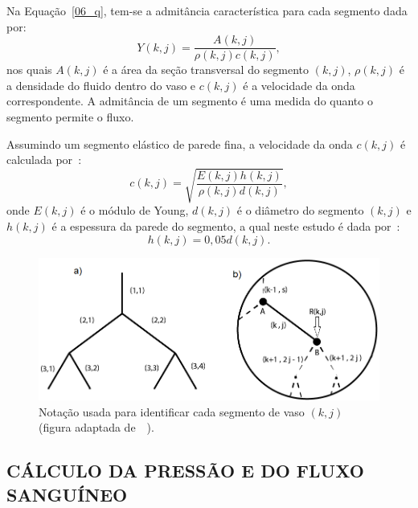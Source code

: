 Na Equação~\eqref{06_q}, tem-se a admitância característica para cada segmento dada por:
\begin{equation}
	Y(k,j) = \frac{A(k,j)}{\rho(k,j)c(k,j)},
	\label{eq:admitancia}
\end{equation}
nos quais $A(k,j)$ é a área da seção transversal do segmento $(k,j)$, $\rho(k,j)$ é a densidade do fluido dentro do vaso e $c(k,j)$ é a velocidade da onda correspondente. A admitância de um segmento é uma medida do quanto o segmento permite o fluxo.

Assumindo um segmento elástico de parede fina, a velocidade da onda $c(k,j)$ é calculada
por~\cite{Fung}:
\begin{equation}
	c(k,j) = \sqrt{\frac{E(k,j) h(k,j)}{\rho(k,j) d(k,j)}},\label{eq:velocidade}
\end{equation}
onde $E(k,j)$ é o módulo de Young, $d(k,j)$ é o diâmetro do segmento $(k,j)$ e $h(k,j)$ é a espessura da parede do segmento, a qual neste estudo é dada por~\cite{Duan}: 
\begin{equation}
	h(k,j) = 0,05 d(k,j).
\end{equation}

\begin{figure}[h] 
	\begin{center}
		\includegraphics[scale = 0.5]{Figures/ArterialTree_Zamir.png}%
		\caption{Notação usada para identificar cada segmento de vaso $(k,j)$ (figura adaptada de~\citeyear{Duan}~). }
		\label{fig1:arterial-tree}%
	\end{center}
\end{figure}

\subsection{CÁLCULO DA PRESSÃO E DO FLUXO SANGUÍNEO}\label{sec:pressao-fluxo}

